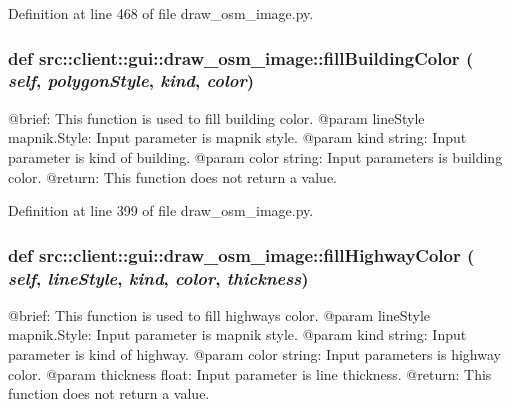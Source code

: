 Definition at line 468 of file draw\_\-osm\_\-image.py.

\hypertarget{namespacesrc_1_1client_1_1gui_1_1draw__osm__image_a1540bc91a7973efd5d2f744ff8e93146}{
\subsubsection[{fillBuildingColor}]{\setlength{\rightskip}{0pt plus 5cm}def src::client::gui::draw\_\-osm\_\-image::fillBuildingColor ( {\em self}, \/   {\em polygonStyle}, \/   {\em kind}, \/   {\em color})}}
\label{namespacesrc_1_1client_1_1gui_1_1draw__osm__image_a1540bc91a7973efd5d2f744ff8e93146}
\begin{DoxyVerb}
@brief: This function is used to fill building color.
@param lineStyle mapnik.Style: Input parameter is mapnik style.
@param kind string: Input parameter is kind of building.
@param color string: Input parameters is building color. 
@return: This function does not return a value.
\end{DoxyVerb}
 

Definition at line 399 of file draw\_\-osm\_\-image.py.

\hypertarget{namespacesrc_1_1client_1_1gui_1_1draw__osm__image_a03f4f8efb5717cc9991c30c43cca88aa}{
\subsubsection[{fillHighwayColor}]{\setlength{\rightskip}{0pt plus 5cm}def src::client::gui::draw\_\-osm\_\-image::fillHighwayColor ( {\em self}, \/   {\em lineStyle}, \/   {\em kind}, \/   {\em color}, \/   {\em thickness})}}
\label{namespacesrc_1_1client_1_1gui_1_1draw__osm__image_a03f4f8efb5717cc9991c30c43cca88aa}
\begin{DoxyVerb}
@brief: This function is used to fill highways color.
@param lineStyle mapnik.Style: Input parameter is mapnik style.
@param kind string: Input parameter is kind of highway.
@param color string: Input parameters is highway color.
@param thickness float: Input parameter is line thickness.  
@return: This function does not return a value.
\end{DoxyVerb}
 

